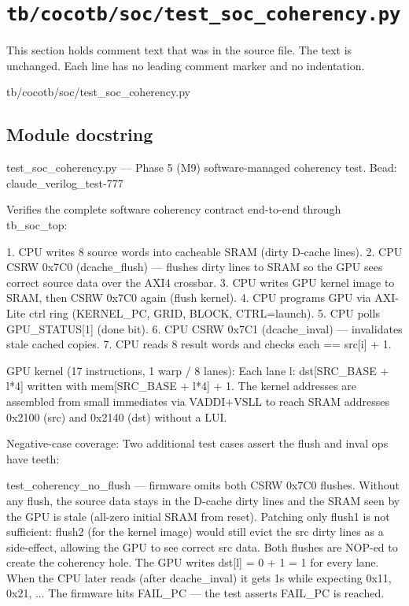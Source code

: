 \section{\texttt{tb/cocotb/soc/test\_soc\_coherency.py}}\label{tm:suite:soc-test-soc-coherency}

This section holds comment text that was in the source file. The text is unchanged. Each line has no leading comment marker and no indentation.

\begin{relocated}{tb/cocotb/soc/test_soc_coherency.py}

\subsection*{Module docstring}

\begin{textblock}
test_soc_coherency.py — Phase 5 (M9) software-managed coherency test.
Bead: claude_verilog_test-777

Verifies the complete software coherency contract end-to-end through
tb_soc_top:

1. CPU writes 8 source words into cacheable SRAM (dirty D-cache lines).
2. CPU CSRW 0x7C0 (dcache_flush) — flushes dirty lines to SRAM so the GPU
sees correct source data over the AXI4 crossbar.
3. CPU writes GPU kernel image to SRAM, then CSRW 0x7C0 again (flush kernel).
4. CPU programs GPU via AXI-Lite ctrl ring (KERNEL_PC, GRID, BLOCK, CTRL=launch).
5. CPU polls GPU_STATUS[1] (done bit).
6. CPU CSRW 0x7C1 (dcache_inval) — invalidates stale cached copies.
7. CPU reads 8 result words and checks each == src[i] + 1.

GPU kernel (17 instructions, 1 warp / 8 lanes):
Each lane l: dst[SRC_BASE + l*4] written with mem[SRC_BASE + l*4] + 1.
The kernel addresses are assembled from small immediates via VADDI+VSLL
to reach SRAM addresses 0x2100 (src) and 0x2140 (dst) without a LUI.

Negative-case coverage:
Two additional test cases assert the flush and inval ops have teeth:

test_coherency_no_flush — firmware omits both CSRW 0x7C0 flushes.
Without any flush, the source data stays in the D-cache dirty lines and
the SRAM seen by the GPU is stale (all-zero initial SRAM from reset).
Patching only flush1 is not sufficient: flush2 (for the kernel image)
would still evict the src dirty lines as a side-effect, allowing the GPU
to see correct src data.  Both flushes are NOP-ed to create the coherency
hole.  The GPU writes dst[l] = 0 + 1 = 1 for every lane.  When the CPU
later reads (after dcache_inval) it gets 1s while expecting 0x11, 0x21, ...
The firmware hits FAIL_PC — the test asserts FAIL_PC is reached.


\end{textblock}
\end{relocated}
